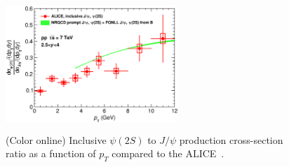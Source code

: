 \documentclass{iopart}
\begin{document}
\begin{figure}[t]
 \begin{center}
 \includegraphics[width=6.5cm,height=5.0cm,angle=0]{7TeV_Inclusive_Ratio_ALICE_All.eps}
 \end{center}
 \caption{(Color online) Inclusive $\psi(2S)$ to $J/\psi$ production cross-section ratio as a function of $p_{T}$ compared to the 
 ALICE~\cite{epjc}.}
 \label{fig4}
 \end{figure}
 
\end{document}
